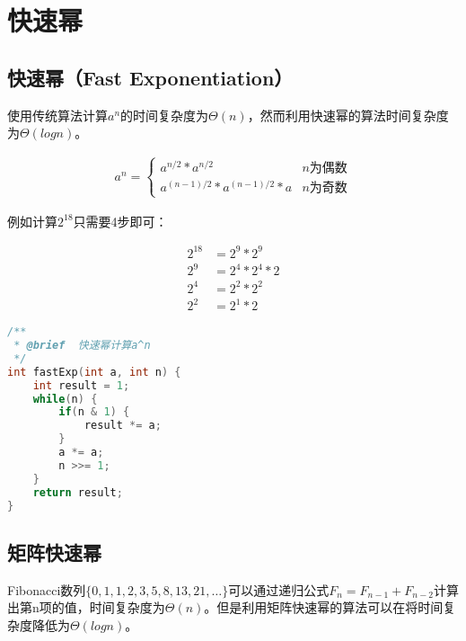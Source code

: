 \newpage

\section{快速幂}

\subsection{快速幂（Fast Exponentiation）}

使用传统算法计算$ a^n $的时间复杂度为$ \Theta(n) $，然而利用快速幂的算法时间复杂度为$ \Theta(logn) $。

\vspace{-0.5cm}

\begin{align*}
    a^n = \begin{cases}
        a^{n/2} * a^{n/2}             & n\text{为偶数} \\
        a^{(n-1)/2} * a^{(n-1)/2} * a & n\text{为奇数}
    \end{cases}
\end{align*}

例如计算$ 2^{18} $只需要4步即可：

\vspace{-0.5cm}

\begin{align*}
    2^{18} & = 2^9 * 2^9     \\
    2^9    & = 2^4 * 2^4 * 2 \\
    2^4    & = 2^2 * 2^2     \\
    2^2    & = 2^1 * 2
\end{align*}


\begin{lstlisting}[language=C]
/**
 * @brief  快速幂计算a^n
 */
int fastExp(int a, int n) {
    int result = 1;
    while(n) {
        if(n & 1) {
            result *= a;
        }
        a *= a;
        n >>= 1;
    }
    return result;
}
\end{lstlisting}

\subsection{矩阵快速幂}

Fibonacci数列$ \{0, 1, 1, 2, 3, 5, 8, 13, 21, \dots \} $可以通过递归公式$ F_n = F_{n-1} + F_{n-2} $计算出第n项的值，时间复杂度为$ \Theta(n) $。但是利用矩阵快速幂的算法可以在将时间复杂度降低为$ \Theta(logn) $。 \\

